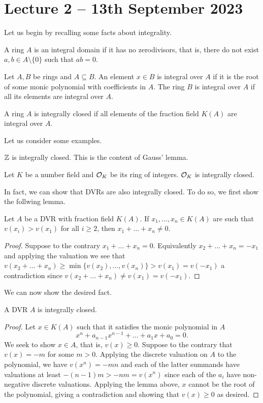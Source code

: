 \section{Lecture 2 -- 13th September 2023}
Let us begin by recalling some facts about integrality. 
\begin{definition}
  A ring $A$ is an integral domain if it has no zerodivisors, that is, there do not exist $a,b\in A\setminus\{0\}$ such that $ab=0$. 
\end{definition}
\begin{definition}
  Let $A,B$ be rings and $A\subseteq B$. An element $x\in B$ is integral over $A$ if it is the root of some monic polynomial with coefficients in $A$. The ring $B$ is integral over $A$ if all its elements are integral over $A$. 
\end{definition}
\begin{definition}
  A ring $A$ is integrally closed if all elements of the fraction field $K(A)$ are integral over $A$. 
\end{definition}
Let us consider some examples. 
\begin{example}
  $\mathbb{Z}$ is integrally closed. This is the content of Gauss' lemma. 
\end{example}
\begin{example}
  Let $K$ be a number field and $\mathcal{O}_{K}$ be its ring of integers. $\mathcal{O}_{K}$ is integrally closed. 
\end{example}
In fact, we can show that DVRs are also integrally closed. To do so, we first show the follwing lemma. 
\begin{lemma}
  Let $A$ be a DVR with fraction field $K(A)$. If $x_{1},\dots,x_{n}\in K(A)$ are such that $v(x_{i})>v(x_{1})$ for all $i\geq 2$, then $x_{1}+\dots+x_{n}\neq0$. 
\end{lemma}
\begin{proof}
  Suppose to the contrary $x_{1}+\dots+x_{n}=0$. Equivalently $x_{2}+\dots+x_{n}=-x_{1}$ and applying the valuation we see that $v(x_{2}+\dots+x_{n})\geq\min\{v(x_{2}),\dots,v(x_{n})\}>v(x_{1})=v(-x_{1})$ a contradiction since $v(x_{2}+\dots+x_{n})\neq v(x_{1})=v(-x_{1})$. 
\end{proof}
We can now show the desired fact. 
\begin{proposition}\label{prop:DVR integrally closed}
  A DVR $A$ is integrally closed. 
\end{proposition}
\begin{proof}
Let $x\in K(A)$ such that it satisfies the monic polynomial in $A$
$$x^{n}+a_{n-1}x^{n-1}+\dots+a_{1}x+a_{0}=0.$$
We seek to show $x\in A$, that is, $v(x)\geq0$. Suppose to the contrary that $v(x)=-m$ for some $m>0$. Applying the discrete valuation on $A$ to the polynomial, we have $v(x^{n})=-mn$ and each of the latter summands have valuations at least $-(n-1)m>-nm=v(x^{n})$ since each of the $a_{i}$ have non-negative discrete valuations. Applying the lemma above, $x$ cannot be the root of the polynomial, giving a contradiction and showing that $v(x)\geq0$ as desired. 
\end{proof}
